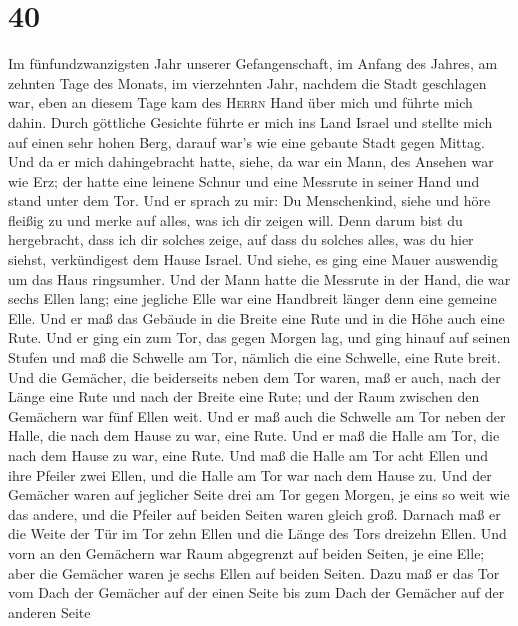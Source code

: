 \hypertarget{section-39}{%
\section{40}\label{section-39}}

 Im fünfundzwanzigsten Jahr unserer Gefangenschaft, im
Anfang des Jahres, am zehnten Tage des Monats, im vierzehnten Jahr,
nachdem die Stadt geschlagen war, eben an diesem Tage kam des
\textsc{Herrn} Hand über mich und führte mich dahin. 
Durch göttliche Gesichte führte er mich ins Land Israel und stellte mich
auf einen sehr hohen Berg, darauf war's wie eine gebaute Stadt gegen
Mittag.  Und da er mich dahingebracht hatte, siehe, da war
ein Mann, des Ansehen war wie Erz; der hatte eine leinene Schnur und
eine Messrute in seiner Hand und stand unter dem Tor.  Und
er sprach zu mir: Du Menschenkind, siehe und höre fleißig zu und merke
auf alles, was ich dir zeigen will. Denn darum bist du hergebracht, dass
ich dir solches zeige, auf dass du solches alles, was du hier siehst,
verkündigest dem Hause Israel.  Und siehe, es ging eine
Mauer auswendig um das Haus ringsumher. Und der Mann hatte die Messrute
in der Hand, die war sechs Ellen lang; eine jegliche Elle war eine
Handbreit länger denn eine gemeine Elle. Und er maß das Gebäude in die
Breite eine Rute und in die Höhe auch eine Rute.  Und er
ging ein zum Tor, das gegen Morgen lag, und ging hinauf auf seinen
Stufen und maß die Schwelle am Tor, nämlich die eine Schwelle, eine Rute
breit.  Und die Gemächer, die beiderseits neben dem Tor
waren, maß er auch, nach der Länge eine Rute und nach der Breite eine
Rute; und der Raum zwischen den Gemächern war fünf Ellen weit. Und er
maß auch die Schwelle am Tor neben der Halle, die nach dem Hause zu war,
eine Rute.  Und er maß die Halle am Tor, die nach dem
Hause zu war, eine Rute.  Und maß die Halle am Tor acht
Ellen und ihre Pfeiler zwei Ellen, und die Halle am Tor war nach dem
Hause zu.  Und der Gemächer waren auf jeglicher Seite
drei am Tor gegen Morgen, je eins so weit wie das andere, und die
Pfeiler auf beiden Seiten waren gleich groß.  Darnach maß
er die Weite der Tür im Tor zehn Ellen und die Länge des Tors dreizehn
Ellen.  Und vorn an den Gemächern war Raum abgegrenzt auf
beiden Seiten, je eine Elle; aber die Gemächer waren je sechs Ellen auf
beiden Seiten.  Dazu maß er das Tor vom Dach der Gemächer
auf der einen Seite bis zum Dach der Gemächer auf der anderen Seite
